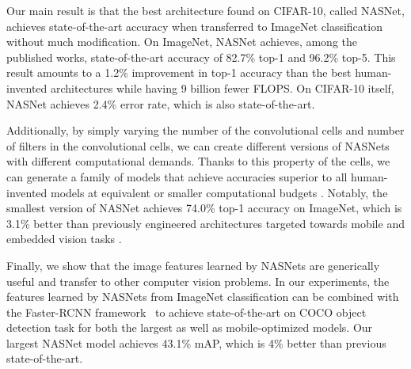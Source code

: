 \documentclass[10pt,twocolumn,letterpaper]{article}
\begin{document}
Our main result is that the best architecture found on CIFAR-10, called NASNet,
achieves state-of-the-art accuracy when transferred to ImageNet classification without much modification. On ImageNet, NASNet achieves, among the published works, state-of-the-art accuracy of 82.7\% top-1 and 96.2\% top-5. This result amounts to a 1.2\% improvement in top-1 accuracy than the best human-invented architectures while having 9 billion fewer FLOPS. On CIFAR-10 itself, NASNet achieves 2.4\% error rate, which is also state-of-the-art.


  Additionally, by simply varying the number of the convolutional cells and number of filters in the convolutional cells, we can create different versions of NASNets with different computational demands. Thanks to this property of the cells, we can generate a family of models that achieve accuracies superior to all human-invented models at equivalent or smaller computational budgets \cite{szegedy2016rethinking,BatchNorm}. Notably, the smallest version of NASNet achieves 74.0\% top-1 accuracy on ImageNet, which is 3.1\% better than previously engineered architectures targeted towards mobile and embedded vision tasks \cite{howard2017mobilenets,shufflenet}.

Finally, we show that the image features learned by NASNets are generically useful and transfer to other computer vision problems. In our experiments, the features learned by NASNets from ImageNet classification can be combined with the Faster-RCNN framework~\cite{faster_rcnn} to achieve state-of-the-art on COCO object detection task for both the largest as well as mobile-optimized models. Our largest NASNet model achieves 43.1\% mAP, which is 4\% better than previous state-of-the-art. %
\end{document}
